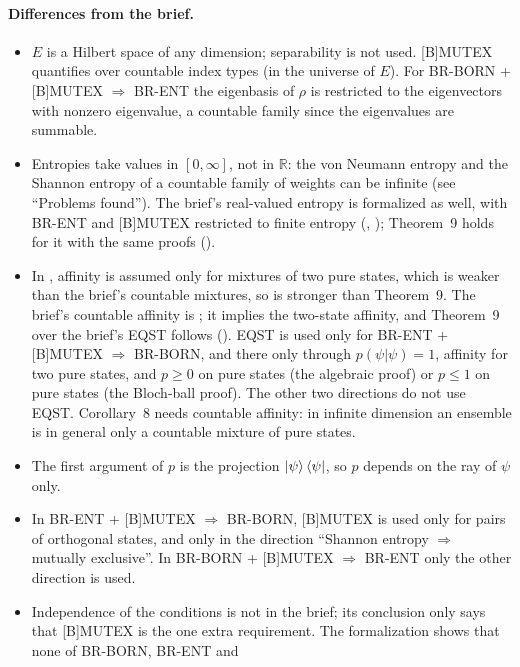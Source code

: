 \documentclass[11pt]{article}
\begin{document}
\paragraph{Differences from the brief.}
\begin{itemize}
\item $E$ is a Hilbert space of any dimension; separability is not used. [B]MUTEX quantifies over
  countable index types (in the universe of $E$). For BR-BORN + [B]MUTEX $\Rightarrow$ BR-ENT the
  eigenbasis of $\rho$ is restricted to the eigenvectors with nonzero eigenvalue, a countable
  family since the eigenvalues are summable.
\item Entropies take values in $[0, \infty]$, not in $\mathbb{R}$: the von Neumann entropy and the
  Shannon entropy of a countable family of weights can be infinite (see ``Problems found'').
  The brief's real-valued entropy is formalized as well, with BR-ENT and [B]MUTEX restricted to
  finite entropy (, ); Theorem~9
  holds for it with the same proofs ().
\item In , affinity is assumed only for mixtures of two pure states,
  which is weaker than the brief's countable mixtures, so  is
  stronger than Theorem~9. The brief's countable affinity is ; it implies
  the two-state affinity, and Theorem~9 over the brief's EQST follows
  (). EQST is used only for BR-ENT +
  [B]MUTEX $\Rightarrow$ BR-BORN, and there only through $p(\psi|\psi) = 1$, affinity for two
  pure states, and $p \ge 0$ on pure states (the algebraic proof) or $p \le 1$ on pure states
  (the Bloch-ball proof). The other two directions do not use EQST. Corollary~8 needs countable
  affinity: in infinite dimension an ensemble is in general only a countable mixture of pure
  states.
\item The first argument of $p$ is the projection $\ket\psi\bra\psi$, so $p$ depends on the ray of
  $\psi$ only.
\item In BR-ENT + [B]MUTEX $\Rightarrow$ BR-BORN, [B]MUTEX is used only for pairs of orthogonal
  states, and only in the direction ``Shannon entropy $\Rightarrow$ mutually exclusive''. In
  BR-BORN + [B]MUTEX $\Rightarrow$ BR-ENT only the other direction is used.
\item Independence of the conditions is not in the brief; its conclusion only says that
  [B]MUTEX is the one extra requirement. The formalization shows that none of BR-BORN, BR-ENT and

\end{itemize}
\end{document}
